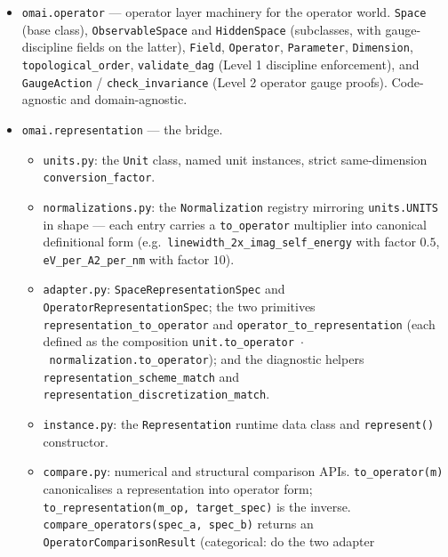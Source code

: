\documentclass[11pt,a4paper]{article}
\begin{document}
\begin{itemize}[leftmargin=2em, itemsep=0.3em]
  \item \texttt{omai.operator} --- operator layer machinery for the operator world.
        \texttt{Space} (base class), \texttt{ObservableSpace} and \texttt{HiddenSpace}
        (subclasses, with gauge-discipline fields on the latter), \texttt{Field},
        \texttt{Operator}, \texttt{Parameter}, \texttt{Dimension},
        \texttt{topological\_order},
        \texttt{validate\_dag} (Level 1 discipline enforcement), and
        \texttt{GaugeAction} / \texttt{check\_invariance} (Level 2 operator
        gauge proofs). Code-agnostic and domain-agnostic.
  \item \texttt{omai.representation} --- the bridge.
    \begin{itemize}[leftmargin=1.2em]
      \item \texttt{units.py}: the \texttt{Unit} class, named unit instances, strict
            same-dimension \texttt{conversion\_factor}.
      \item \texttt{normalizations.py}: the \texttt{Normalization} registry
            mirroring \texttt{units.UNITS} in shape --- each entry carries a
            \texttt{to\_operator} multiplier into canonical definitional form
            (e.g.\ \texttt{linewidth\_2x\_imag\_self\_energy} with factor
            $0.5$, \texttt{eV\_per\_A2\_per\_nm} with factor $10$).
      \item \texttt{adapter.py}: \texttt{SpaceRepresentationSpec} and
            \texttt{OperatorRepresentationSpec}; the two primitives
            \texttt{representation\_to\_operator} and
            \texttt{operator\_to\_representation} (each defined as the
            composition \texttt{unit.to\_operator}~$\cdot$~\texttt{normalization.to\_operator});
            and the diagnostic helpers
            \texttt{representation\_scheme\_match} and
            \texttt{representation\_discretization\_match}.
      \item \texttt{instance.py}: the \texttt{Representation} runtime data class
            and \texttt{represent()} constructor.
      \item \texttt{compare.py}: numerical and structural comparison APIs.
            \texttt{to\_operator(m)} canonicalises a representation into operator
            form; \texttt{to\_representation(m\_op, target\_spec)} is the
            inverse. \texttt{compare\_operators(spec\_a, spec\_b)} returns an
            \texttt{OperatorComparisonResult} (categorical: do the two adapter

\end{itemize}
\end{itemize}
\end{document}
